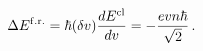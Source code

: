 \begin{equation}
\Delta E^{\rm f.r.}=\hbar (\delta v)\frac{dE^{\rm cl}}{dv}=
-\frac{evn\hbar}{\sqrt{2}} \,.\label{DEfr}
\end{equation}


